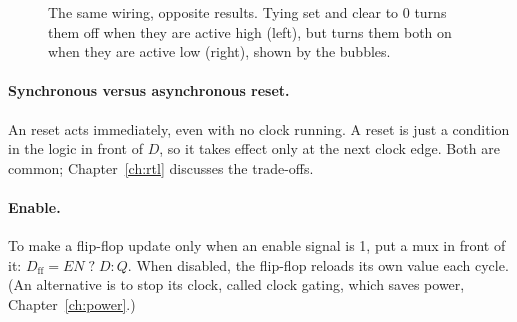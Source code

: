 \begin{figure}[h]
\centering
{}
\caption{The same wiring, opposite results. Tying set and clear to 0 turns them off when they are active high (left), but turns them both on when they are active low (right), shown by the bubbles.}
\label{fig:setclear}
\end{figure}

\paragraph{Synchronous versus asynchronous reset.} An  reset acts immediately, even with no clock running. A  reset is just a condition in the logic in front of $D$, so it takes effect only at the next clock edge. Both are common; Chapter~\ref{ch:rtl} discusses the trade-offs.

\paragraph{Enable.} To make a flip-flop update only when an enable signal is 1, put a mux in front of it: $D_{\text{ff}} = EN\;?\;D : Q$. When disabled, the flip-flop reloads its own value each cycle. (An alternative is to stop its clock, called clock gating, which saves power, Chapter~\ref{ch:power}.)

